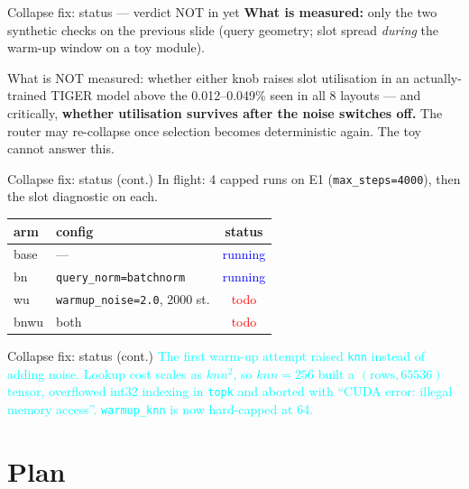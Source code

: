 \documentclass{beamer}
\newcommand{\pierre}[1]{\textcolor{cyan}{#1}}
\newcommand{\strun}{\textcolor{blue}{running}}
\newcommand{\sttodo}{\textcolor{red}{todo}}
\begin{document}
\begin{frame}{Collapse fix: status --- \alert{verdict NOT in yet}}
\textbf{What is measured:} only the two synthetic checks on the previous slide
(query geometry; slot spread \emph{during} the warm-up window on a toy module).

\medskip
\alert{What is NOT measured:} whether either knob raises slot utilisation in an
actually-trained TIGER model above the 0.012--0.049\% seen in all 8 layouts ---
and critically, \textbf{whether utilisation survives after the noise switches
off.} The router may re-collapse once selection becomes deterministic again. The
toy cannot answer this.

\end{frame}

\begin{frame}{Collapse fix: status (cont.)}
In flight: 4 capped runs on E1 (\texttt{max\_steps=4000}), then the slot
diagnostic on each.
\begin{center}
\begin{tabular}{|l|l|c|}
\hline
arm & config & status \\
\hline
base  & ---                                 & \strun \\
bn    & \texttt{query\_norm=batchnorm}       & \strun \\
wu    & \texttt{warmup\_noise=2.0}, 2000 st. & \sttodo \\
bnwu  & both                                 & \sttodo \\
\hline
\end{tabular}
\end{center}

\end{frame}

\begin{frame}{Collapse fix: status (cont.)}
\pierre{The first warm-up attempt raised \texttt{knn} instead of adding noise.
Lookup cost scales as $knn^2$, so $knn{=}256$ built a $(\text{rows},65536)$
tensor, overflowed int32 indexing in \texttt{topk} and aborted with ``CUDA error:
illegal memory access''. \texttt{warmup\_knn} is now hard-capped at 64.}
\end{frame}

\section{Plan}
\end{document}
